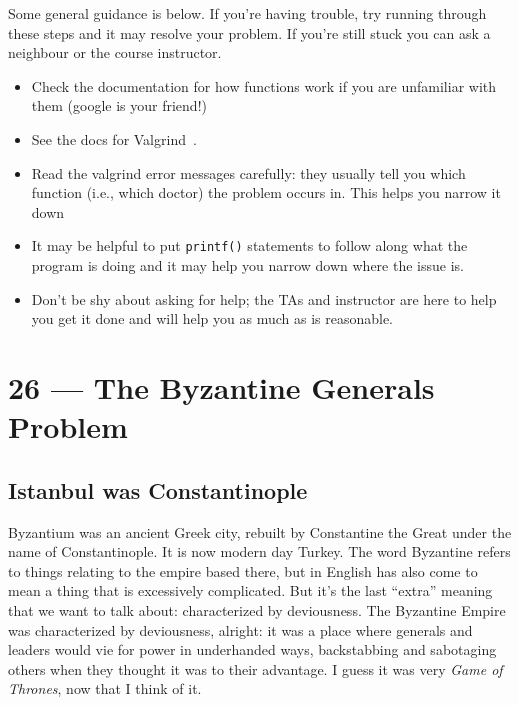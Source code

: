 \documentclass[a4paper]{report}
\begin{document}
Some general guidance is below. If you're having trouble, try running through these steps and it may resolve your problem. If you're still stuck you can ask a neighbour or the course instructor.
\begin{itemize}
	\item Check the documentation for how functions work if you are unfamiliar with them (google is your friend!)
	\item See the docs for Valgrind~\cite{valgrind:tools}.
	\item Read the valgrind error messages carefully: they usually tell you which function (i.e., which doctor) the problem occurs in. This helps you narrow it down 
	\item It may be helpful to put \texttt{printf()} statements to follow along what the program is doing and it may help you narrow down where the issue is.
	\item Don't be shy about asking for help; the TAs and instructor are here to help you get it done and will help you as much as is reasonable.
\end{itemize}









\chapter*{26 --- The Byzantine Generals Problem}


\section*{Istanbul was Constantinople}
Byzantium was an ancient Greek city, rebuilt by Constantine the Great under the name of Constantinople. It is now modern day Turkey. The word Byzantine refers to things relating to the empire based there, but in English has also come to mean a thing that is excessively complicated. But it's the last ``extra'' meaning that we want to talk about: characterized by deviousness. The Byzantine Empire was characterized by deviousness, alright: it was a place where generals and leaders would vie for power in underhanded ways, backstabbing and sabotaging others when they thought it was to their advantage. I guess it was very \textit{Game of Thrones}, now that I think of it.
\end{document}

